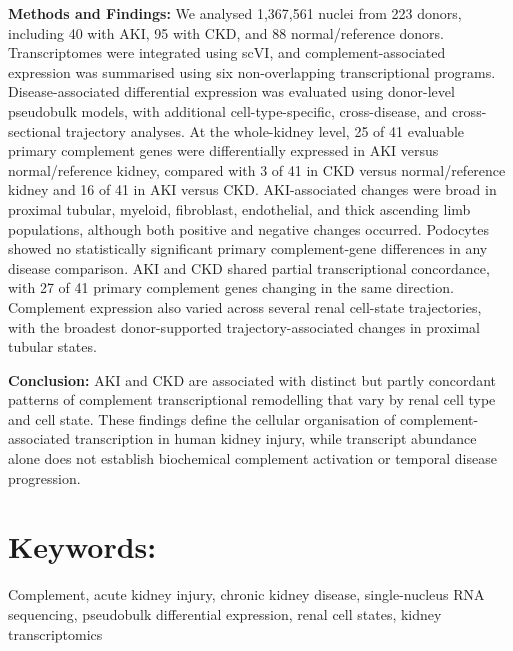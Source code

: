 \documentclass[10pt,letterpaper]{article}
\begin{document}
\bigskip
\noindent
\textbf{Methods and Findings:}
We analysed 1,367,561 nuclei from 223 donors, including 40 with AKI, 95 with CKD, and 88 normal/reference donors. Transcriptomes were integrated using scVI, and complement-associated expression was summarised using six non-overlapping transcriptional programs. Disease-associated differential expression was evaluated using donor-level pseudobulk models, with additional cell-type-specific, cross-disease, and cross-sectional trajectory analyses. At the whole-kidney level, 25 of 41 evaluable primary complement genes were differentially expressed in AKI versus normal/reference kidney, compared with 3 of 41 in CKD versus normal/reference kidney and 16 of 41 in AKI versus CKD. AKI-associated changes were broad in proximal tubular, myeloid, fibroblast, endothelial, and thick ascending limb populations, although both positive and negative changes occurred. Podocytes showed no statistically significant primary complement-gene differences in any disease comparison. AKI and CKD shared partial transcriptional concordance, with 27 of 41 primary complement genes changing in the same direction. Complement expression also varied across several renal cell-state trajectories, with the broadest donor-supported trajectory-associated changes in proximal tubular states.

\bigskip
\noindent
\textbf{Conclusion:}
AKI and CKD are associated with distinct but partly concordant patterns of complement transcriptional remodelling that vary by renal cell type and cell state. These findings define the cellular organisation of complement-associated transcription in human kidney injury, while transcript abundance alone does not establish biochemical complement activation or temporal disease progression.

\section*{Keywords:}
Complement, acute kidney injury, chronic kidney disease, single-nucleus RNA sequencing, pseudobulk differential expression, renal cell states, kidney transcriptomics


\clearpage
{}
\linenumbers
\end{document}
